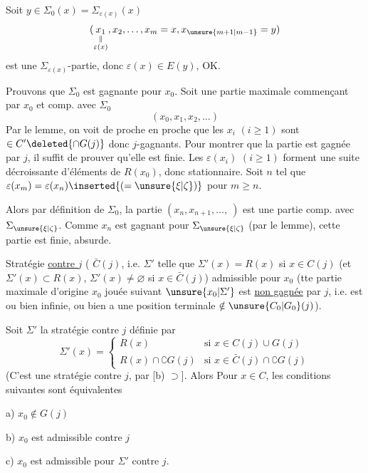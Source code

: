 Soit $y\in\Sigma_0(x)=\Sigma_{\varepsilon(x)}(x)$
\[
(\underset{\substack{\Vert\\\varepsilon(x)}}{x_1},x_2,\ldots,x_m=x,x_{\unsure{m+1|m-1}}=y)
\]
est une $\Sigma_{\varepsilon(x)}$-partie, donc  $\varepsilon(x)\in E(y)$, OK.

Prouvons que $\Sigma_0$ est gagnante pour $x_0$.
Soit une partie maximale commençant par $x_0$
et comp. avec $\Sigma_0$
\[
(x_0,x_1,x_2,\ldots)
\]
Par le lemme, on voit de proche en proche   que  les $x_i$ $(i\geq1)$ sont $\in C'\deleted{\cap G(j)}$ donc $j$-gagnants. Pour montrer que la partie est gagnée par $j$, il suffit de prouver qu'elle est finie.   Les $\varepsilon(x_i)$ $(i\geq1)$ forment une suite décroissante d'éléments de $R(x_0)$, donc stationnaire. Soit $n$ tel que $\varepsilon(x_m)=\varepsilon(x_n)\inserted{(=\unsure{\xi|\zeta})}$ pour $m\geq n$.

Alors par définition de $\Sigma_0$, la partie $(x_n,x_{n+1},\ldots,\ )$ est une partie comp. avec $\Sigma_{\unsure{\xi|\zeta}}$. Comme $x_n$ est gagnant pour $\Sigma_{\unsure{\xi|\zeta}}$ (par le lemme), cette partie est finie, absurde.

Stratégie \uline{contre $j$} ( $\bar C(j)$, i.e. $\Sigma'$ telle que $\Sigma'(x)=R(x)$ si $x\in C(j)$ (et $\Sigma'(x)\subset R(x)$, $\Sigma'(x)\ne\varnothing$ si $x\in\bar C(j)$) admissible pour $x_0$ (tte partie maximale d'origine $x_0$ jouée suivant $\unsure{x_0|\Sigma'}$ est \uline{non gagnée} par $j$, i.e. est ou bien infinie, ou bien a une position terminale $\notin\unsure{C_0|G_0}(j)$).

  Soit $\Sigma'$ la stratégie contre $j$ définie par
\[
\Sigma'(x)=\begin{cases}
R(x)&\text{si }x\in C(j)\cup G(j)\\
R(x)\cap\complement G(j)&\text{si }x\in\bar C(j)\cap\complement G(j)
\end{cases}
\]
(C'est une stratégie contre $j$, par [b) $\supset$]. Alors Pour $x\in C$, les conditions suivantes sont équivalentes

a) $x_0\notin G(j)$

b) $x_0$ est admissible contre $j$

c) $x_0$ est admissible pour $\Sigma'$ contre $j$.

